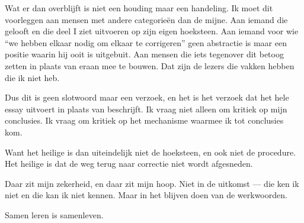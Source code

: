 \documentclass[11pt,a4paper]{article}
\begin{document}
Wat er dan overblijft is niet een houding maar een handeling. Ik moet dit voorleggen aan mensen met andere categorieën dan de mijne. Aan iemand die gelooft en die deel I ziet uitvoeren op zijn eigen hoeksteen. Aan iemand voor wie \enquote{we hebben elkaar nodig om elkaar te corrigeren} geen abstractie is maar een positie waarin hij ooit is uitgebuit. Aan mensen die iets tegenover dit betoog zetten in plaats van eraan mee te bouwen. Dat zijn de lezers die vakken hebben die ik niet heb.

Dus dit is geen slotwoord maar een verzoek, en het is het verzoek dat het hele essay uitvoert in plaats van beschrijft. Ik vraag niet alleen om kritiek op mijn conclusies. Ik vraag om kritiek op het mechanisme waarmee ik tot conclusies kom.

Want het heilige is dan uiteindelijk niet de hoeksteen, en ook niet de procedure. Het heilige is dat de weg terug naar correctie niet wordt afgesneden.

Daar zit mijn zekerheid, en daar zit mijn hoop. Niet in de uitkomst --- die ken ik niet en die kan ik niet kennen. Maar in het blijven doen van de werkwoorden.

Samen leren is samenleven.
\end{document}
